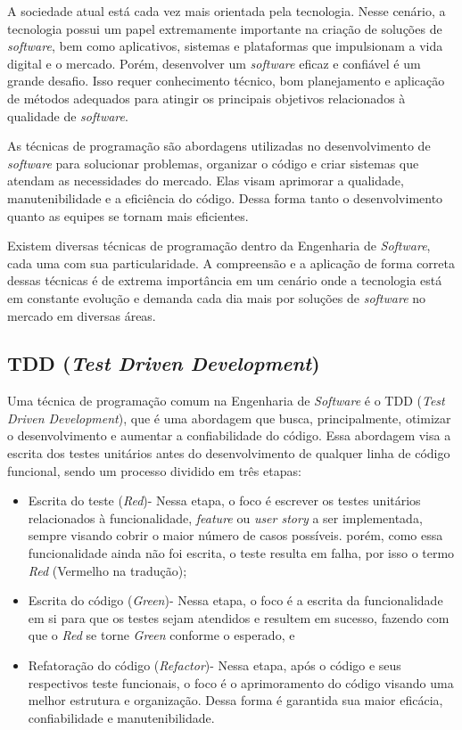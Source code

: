 A sociedade atual está cada vez mais orientada pela tecnologia. Nesse cenário, a tecnologia possui um papel 
extremamente importante na criação de soluções de \textit{software}, bem como aplicativos, sistemas e plataformas 
que impulsionam a vida digital e o mercado. Porém, desenvolver um \textit{software} eficaz e confiável 
é um grande desafio. Isso requer conhecimento técnico, bom planejamento e aplicação de métodos adequados para atingir 
os principais objetivos relacionados à qualidade de \textit{software}.

As técnicas de programação são abordagens utilizadas no desenvolvimento de \textit{software} para solucionar 
problemas, organizar o código e criar sistemas que atendam as necessidades do mercado. Elas visam aprimorar 
a qualidade, manutenibilidade e a eficiência do código. Dessa forma tanto o desenvolvimento quanto as equipes 
se tornam mais eficientes.

Existem diversas técnicas de programação dentro da Engenharia de \textit{Software}, cada uma com sua particularidade. 
A compreensão e a aplicação de forma correta dessas técnicas é de extrema importância em um cenário onde a tecnologia 
está em constante evolução e demanda cada dia mais por soluções de \textit{software} no mercado em diversas áreas.

\subsection{TDD (\textit{Test Driven Development})}

Uma técnica de programação comum na Engenharia de \textit{Software} é o TDD (\textit{Test Driven Development}), 
que é uma abordagem que busca, principalmente, otimizar o desenvolvimento e aumentar a confiabilidade do código. Essa abordagem 
visa a escrita dos testes unitários antes do desenvolvimento de qualquer linha de código funcional, sendo um processo dividido 
em três etapas:

\begin{itemize}

	\item Escrita do teste (\textit{Red})- Nessa etapa, o foco é escrever os testes unitários relacionados à funcionalidade, 
    \textit{feature} ou \textit{user story} a ser implementada, sempre visando cobrir o maior número de casos possíveis. porém, 
    como essa funcionalidade ainda não foi escrita, o teste resulta em falha, por isso o termo \textit{Red} (Vermelho na tradução);
	\item Escrita do código (\textit{Green})- Nessa etapa, o foco é a escrita da funcionalidade em si para que os testes sejam 
    atendidos e resultem em sucesso, fazendo com que o \textit{Red} se torne \textit{Green} conforme o esperado, e
	\item Refatoração do código (\textit{Refactor})- Nessa etapa, após o código e seus respectivos teste funcionais, o foco é o 
    aprimoramento do código visando uma melhor estrutura e organização. Dessa forma é garantida sua maior eficácia, confiabilidade e 
    manutenibilidade.
    
\end{itemize}

